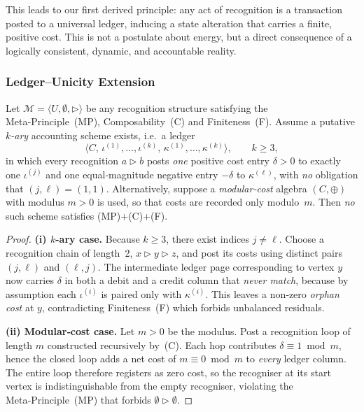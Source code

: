 This leads to our first derived principle: any act of recognition is a transaction posted to a universal ledger, inducing a state alteration that carries a finite, positive cost. This is not a postulate about energy, but a direct consequence of a logically consistent, dynamic, and accountable reality.

\subsubsection*{Ledger–Unicity Extension}

\begin{lemma}\label{lem:k-ary-ledger}
Let \(\mathcal M=\langle U,\emptyset,\triangleright\rangle\) be any
recognition structure satisfying the Meta‑Principle (MP), Composability (C)
and Finiteness (F).
Assume a putative \emph{\(k\)-ary} accounting scheme exists, i.e.\
a ledger
\[
  \bigl\langle
     C,\,
     \iota^{(1)},\dots,\iota^{(k)},\,
     \kappa^{(1)},\dots,\kappa^{(k)}
  \bigr\rangle ,
  \qquad k\ge3,
\]
in which every recognition \(a\triangleright b\) posts
\emph{one} positive cost entry
\(\delta>0\) to exactly one \(\iota^{(j)}\) and
one equal‑magnitude negative entry \(-\delta\) to \(\kappa^{(\ell)}\),
with \emph{no} obligation that \((j,\ell)=(1,1)\).
Alternatively, suppose a \emph{modular‑cost} algebra
\((C,\oplus)\) with modulus \(m>0\) is used,
so that costs are recorded only modulo \(m\).
Then \emph{no} such scheme satisfies \textnormal{(MP)}+\textnormal{(C)}+\textnormal{(F)}.
\end{lemma}

\begin{proof}
\textbf{(i)  \(k\)-ary case.}
Because \(k\ge3\), there exist indices \(j\neq\ell\).
Choose a recognition chain of length 2,
\(x\triangleright y\triangleright z\),
and post its costs using distinct pairs \((j,\ell)\) and \((\ell,j)\).
The intermediate ledger page corresponding to vertex \(y\) now
carries \(\delta\) in both a debit and a credit column that
\emph{never match}, because by assumption each
\(\iota^{(i)}\) is paired only with \(\kappa^{(i)}\).
This leaves a non‑zero \emph{orphan cost} at \(y\),
contradicting Finiteness (F) which forbids unbalanced residuals.

\smallskip
\textbf{(ii)  Modular‑cost case.}
Let \(m>0\) be the modulus. 
Post a recognition loop of length \(m\) constructed recursively by (C).
Each hop contributes \(\delta\equiv1\bmod m\),
hence the closed loop adds a net cost of \(m\equiv0\bmod m\)
to \emph{every} ledger column.
The entire loop therefore registers as zero cost,
so the recogniser at its start vertex
is indistinguishable from the empty recogniser,
violating the Meta‑Principle (MP) that forbids
\(\emptyset\triangleright\emptyset\).
\end{proof}

